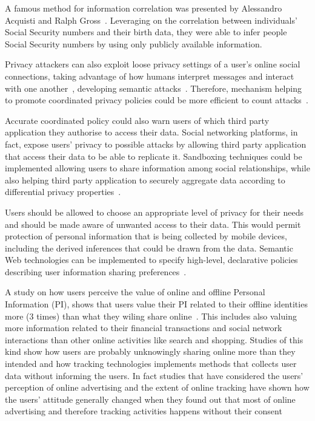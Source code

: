 A famous method for information correlation was presented by Alessandro Acquisti and Ralph Gross~\cite{acquisti-et-al}. Leveraging on the correlation between individuals' Social Security numbers and their birth data, they were able to infer people Social Security numbers by using only publicly available information.

Privacy attackers can also exploit loose privacy settings of a user's online social connections, taking advantage of how humans interpret messages and interact with one another~\cite{cryto-gram}, developing semantic attacks~\cite{Kumaragur-et-all}. Therefore, mechanism helping to promote coordinated privacy policies could be more efficient to count attacks~\cite{brown-et-all}. 

Accurate coordinated policy could also warn users of which third party application they authorise to access their data. Social networking platforms, in fact, expose users' privacy to possible attacks by allowing third party application that access their data to be able to replicate it. Sandboxing techniques could be implemented allowing users to share information among social relationships, while also helping third party application to securely aggregate data according to differential privacy properties~\cite{viswanath2012keeping}. 

Users should be allowed to choose an appropriate level of privacy for their needs and should be made aware of unwanted access to their data. This would permit protection of personal information that is being collected by mobile devices, including the derived inferences that could be drawn from the data. Semantic Web technologies can be implemented to specify high-level, declarative policies describing user information sharing preferences~\cite{jagtap2011preserving}.

A study on how users perceive the value of online and offline Personal Information (PI), shows that users value their PI related to their offline identities more (3 times) than what they wiling share online~\cite{carrascal2013your}. This includes also valuing more information related to their financial transactions and social network interactions than other online activities like search and shopping. Studies of this kind show how users are probably unknowingly sharing online more than they intended and how tracking technologies implements methods that collects user data without informing the users. In fact studies that have considered the users' perception of online advertising and the extent of online tracking have shown how the users' attitude generally changed when they found out that most of online advertising and therefore tracking activities happens without their consent~\cite{cranor2012can}

